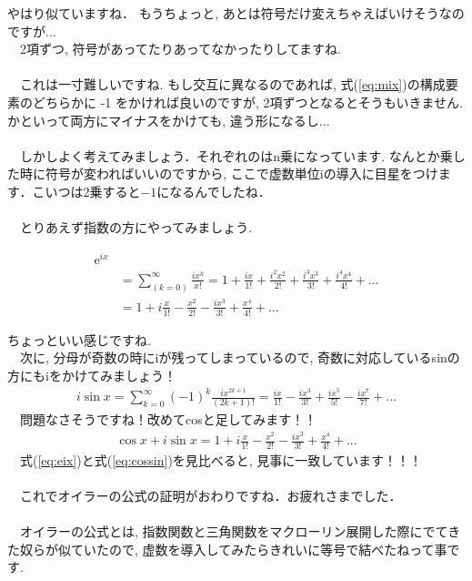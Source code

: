 \documentclass[11pt,a4paper]{ujreport} 	%
\begin{document}
やはり似ていますね． もうちょっと, あとは符号だけ変えちゃえばいけそうなのですが...\\
　2項ずつ, 符号があってたりあってなかったりしてますね.\\
\\
　これは一寸難しいですね. もし交互に異なるのであれば, 式(\ref{eq:mix})の構成要素のどちらかに -1 をかければ良いのですが, 2項ずつとなるとそうもいきません. かといって両方にマイナスをかけても, 違う形になるし...\\
\\
　しかしよく考えてみましょう．それぞれのはn乗になっています. なんとか乗した時に符号が変わればいいのですから, ここで虚数単位iの導入に目星をつけます．こいつは2乗すると$-1$になるんでしたね．\\
\\
　とりあえず指数の方にやってみましょう.

\begin{align}
\mathrm{e}^{ix} \\
& = \sum_{(k=0)}^\infty \frac{ix^k}{x!} = 1 + \frac{ix}{1!} + \frac{i^2x^2}{2!} + \frac{i^3x^3}{3!} + \frac{i^4x^4}{4!} + ...\\
& = 1 + i\frac{x}{1!} - \frac{x^2}{2!} - \frac{ix^3}{3!} + \frac{x^4}{4!} + ...
\label{eq:eix}
\end{align}

ちょっといい感じですね.\\
　次に, 分母が奇数の時にiが残ってしまっているので, 奇数に対応しているsinの方にもiをかけてみましょう！\\
\begin{eqnarray}
i\sin x = \sum_{k=0}^{\infty}(-1)^k \frac{ix^{2k + 1}}{(2k + 1)!} = \frac{ix}{1!} - \frac{ix^3}{3!} + \frac{ix^5}{5!} - \frac{ix^7}{7!} +  ...
\end{eqnarray}
　問題なさそうですね！改めてcosと足してみます！！\\
\begin{eqnarray}
\cos x + i\sin x = 1 + i\frac{x}{1!} - \frac{x^2}{2!} - \frac{ix^3}{3!} + \frac{x^4}{4!} + ...
\label{eq:cossin}
\end{eqnarray}
　式(\ref{eq:eix})と式(\ref{eq:cossin})を見比べると, 見事に一致しています！！！\\
\\
　これでオイラーの公式の証明がおわりですね．お疲れさまでした．\\
\\
　オイラーの公式とは, 指数関数と三角関数をマクローリン展開した際にでてきた奴らが似ていたので, 虚数を導入してみたらきれいに等号で結べたねって事です.\\
\end{document}
